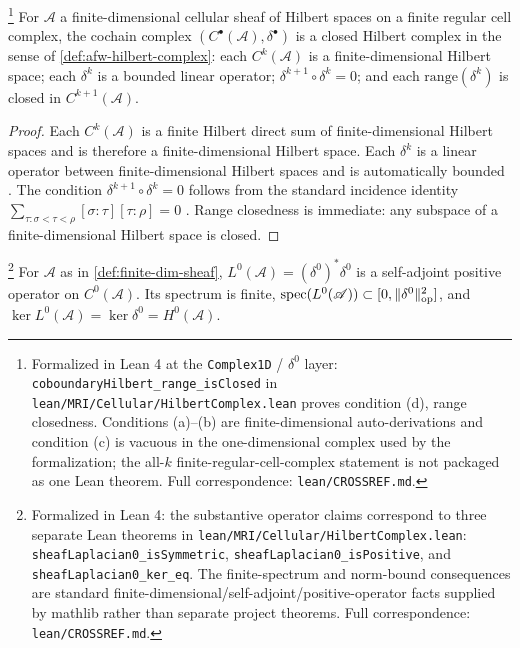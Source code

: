 \begin{theorem}
\label{thm:closed-hilbert-complex}\footnote{Formalized in Lean 4 at the \texttt{Complex1D} / $\delta^0$ layer: \texttt{coboundaryHilbert\_range\_isClosed} in \texttt{lean/MRI/Cellular/HilbertComplex.lean} proves condition (d), range closedness. Conditions (a)--(b) are finite-dimensional auto-derivations and condition (c) is vacuous in the one-dimensional complex used by the formalization; the all-$k$ finite-regular-cell-complex statement is not packaged as one Lean theorem. Full correspondence: \texttt{lean/CROSSREF.md}.}
For $\mathscr{A}$ a finite-dimensional cellular sheaf of Hilbert
spaces on a finite regular cell complex, the cochain complex
$(C^\bullet(\mathscr{A}), \delta^\bullet)$ is a closed Hilbert
complex in the sense of \cref{def:afw-hilbert-complex}: each
$C^k(\mathscr{A})$ is a finite-dimensional Hilbert space; each
$\delta^k$ is a bounded linear operator; $\delta^{k+1} \circ \delta^k = 0$;
and each $\mathrm{range}(\delta^k)$ is closed in $C^{k+1}(\mathscr{A})$.
\end{theorem}

\begin{proof}
Each $C^k(\mathscr{A})$ is a finite Hilbert direct sum of
finite-dimensional Hilbert spaces and is therefore a
finite-dimensional Hilbert space. Each $\delta^k$ is a linear
operator between finite-dimensional Hilbert spaces and is
automatically bounded \cite[\S III.5]{ReedSimonI}. The condition
$\delta^{k+1} \circ \delta^k = 0$ follows from the standard
incidence identity
$\sum_{\tau : \sigma < \tau < \rho} [\sigma : \tau][\tau : \rho] = 0$
\cite[\S 2.1]{Hatcher2002}. Range closedness is immediate: any
subspace of a finite-dimensional Hilbert space is closed.
\end{proof}

\begin{lemma}\label{lem:L0-spectrum}\footnote{Formalized in Lean 4: the substantive operator claims correspond to three separate Lean theorems in \texttt{lean/MRI/Cellular/HilbertComplex.lean}: \texttt{sheafLaplacian0\_isSymmetric}, \texttt{sheafLaplacian0\_isPositive}, and \texttt{sheafLaplacian0\_ker\_eq}. The finite-spectrum and norm-bound consequences are standard finite-dimensional/self-adjoint/positive-operator facts supplied by mathlib rather than separate project theorems. Full correspondence: \texttt{lean/CROSSREF.md}.}
For $\mathscr{A}$ as in \cref{def:finite-dim-sheaf},
$L^0(\mathscr{A}) = (\delta^0)^* \delta^0$ is a self-adjoint
positive operator on $C^0(\mathscr{A})$. Its spectrum is finite,
$\operatorname{spec}(L^0(\mathscr{A})) \subset [0, \lVert \delta^0 \rVert_{\mathrm{op}}^2]$,
and $\ker L^0(\mathscr{A}) = \ker \delta^0 = H^0(\mathscr{A})$.
\end{lemma}

